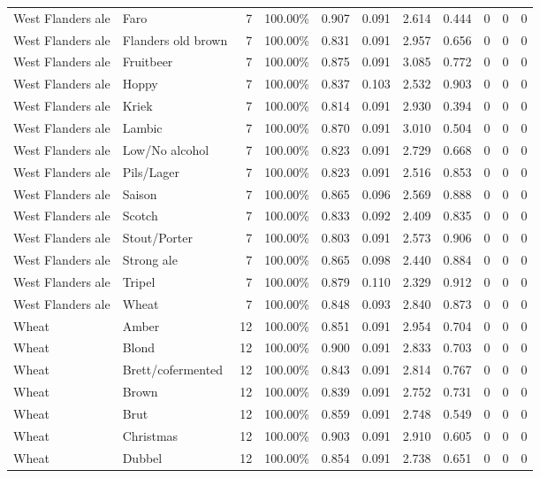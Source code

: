 {\begin{longtable}{llrrrrrrrrr}
West Flanders ale & Faro & 7 & 100.00\% & 0.907 & 0.091 & 2.614 & 0.444 & 0 & 0 & 0 \\
West Flanders ale & Flanders old brown & 7 & 100.00\% & 0.831 & 0.091 & 2.957 & 0.656 & 0 & 0 & 0 \\
West Flanders ale & Fruitbeer & 7 & 100.00\% & 0.875 & 0.091 & 3.085 & 0.772 & 0 & 0 & 0 \\
West Flanders ale & Hoppy & 7 & 100.00\% & 0.837 & 0.103 & 2.532 & 0.903 & 0 & 0 & 0 \\
West Flanders ale & Kriek & 7 & 100.00\% & 0.814 & 0.091 & 2.930 & 0.394 & 0 & 0 & 0 \\
West Flanders ale & Lambic & 7 & 100.00\% & 0.870 & 0.091 & 3.010 & 0.504 & 0 & 0 & 0 \\
West Flanders ale & Low/No alcohol & 7 & 100.00\% & 0.823 & 0.091 & 2.729 & 0.668 & 0 & 0 & 0 \\
West Flanders ale & Pils/Lager & 7 & 100.00\% & 0.823 & 0.091 & 2.516 & 0.853 & 0 & 0 & 0 \\
West Flanders ale & Saison & 7 & 100.00\% & 0.865 & 0.096 & 2.569 & 0.888 & 0 & 0 & 0 \\
West Flanders ale & Scotch & 7 & 100.00\% & 0.833 & 0.092 & 2.409 & 0.835 & 0 & 0 & 0 \\
West Flanders ale & Stout/Porter & 7 & 100.00\% & 0.803 & 0.091 & 2.573 & 0.906 & 0 & 0 & 0 \\
West Flanders ale & Strong ale & 7 & 100.00\% & 0.865 & 0.098 & 2.440 & 0.884 & 0 & 0 & 0 \\
West Flanders ale & Tripel & 7 & 100.00\% & 0.879 & 0.110 & 2.329 & 0.912 & 0 & 0 & 0 \\
West Flanders ale & Wheat & 7 & 100.00\% & 0.848 & 0.093 & 2.840 & 0.873 & 0 & 0 & 0 \\
Wheat & Amber & 12 & 100.00\% & 0.851 & 0.091 & 2.954 & 0.704 & 0 & 0 & 0 \\
Wheat & Blond & 12 & 100.00\% & 0.900 & 0.091 & 2.833 & 0.703 & 0 & 0 & 0 \\
Wheat & Brett/cofermented & 12 & 100.00\% & 0.843 & 0.091 & 2.814 & 0.767 & 0 & 0 & 0 \\
Wheat & Brown & 12 & 100.00\% & 0.839 & 0.091 & 2.752 & 0.731 & 0 & 0 & 0 \\
Wheat & Brut & 12 & 100.00\% & 0.859 & 0.091 & 2.748 & 0.549 & 0 & 0 & 0 \\
Wheat & Christmas & 12 & 100.00\% & 0.903 & 0.091 & 2.910 & 0.605 & 0 & 0 & 0 \\
Wheat & Dubbel & 12 & 100.00\% & 0.854 & 0.091 & 2.738 & 0.651 & 0 & 0 & 0 \\

\end{longtable}}
